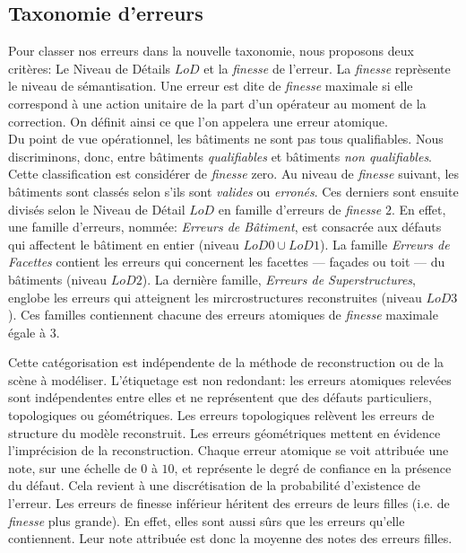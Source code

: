 \documentclass[a4paper,french]{article}
\begin{document}
    \subsection{Taxonomie d'erreurs}

    Pour classer nos erreurs dans la nouvelle taxonomie, nous proposons deux critères: Le Niveau de Détails $LoD$ et la \emph{finesse} de l'erreur. La \emph{finesse} reprèsente le niveau de sémantisation. Une erreur est dite de \emph{finesse} maximale si elle correspond à une action unitaire de la part d'un opérateur au moment de la correction. On définit ainsi ce que l'on appelera une erreur atomique.\\
    Du point de vue opérationnel, les bâtiments ne sont pas tous qualifiables. Nous discriminons, donc, entre bâtiments \emph{qualifiables} et bâtiments \emph{non qualifiables}. Cette classification est considérer de \emph{finesse} zero. Au niveau de \emph{finesse} suivant, les bâtiments sont classés selon s'ils sont \emph{valides} ou \emph{erronés}. Ces derniers sont ensuite divisés selon le Niveau de Détail $LoD$ en famille d'erreurs de \emph{finesse} $2$. En effet, une famille d'erreurs, nommée: \emph{Erreurs de Bâtiment}, est consacrée aux défauts qui affectent le bâtiment en entier (niveau $LoD 0\cup LoD 1$). La famille \emph{Erreurs de Facettes} contient les erreurs qui concernent les facettes --- façades ou toit --- du bâtiments (niveau $LoD 2$). La dernière famille, \emph{Erreurs de Superstructures}, englobe les erreurs qui atteignent les mircrostructures reconstruites (niveau $LoD 3$). Ces familles contiennent chacune des erreurs atomiques de \emph{finesse} maximale égale à $3$.

    Cette catégorisation est indépendente de la méthode de reconstruction ou de la scène à modéliser. L'étiquetage est non redondant: les erreurs atomiques relevées sont indépendentes entre elles et ne représentent que des défauts particuliers, topologiques ou géométriques. Les erreurs topologiques relèvent les erreurs de structure du modèle reconstruit. Les erreurs géométriques mettent en évidence l'imprécision de la reconstruction. Chaque erreur atomique se voit attribuée une note, sur une échelle de $0$ à $10$, et représente le degré de confiance en la présence du défaut. Cela revient à une discrétisation de la probabilité d'existence de l'erreur. Les erreurs de finesse inférieur héritent des erreurs de leurs filles (i.e. de \emph{finesse} plus grande). En effet, elles sont aussi sûrs que les erreurs qu'elle contiennent. Leur note attribuée est donc la moyenne des notes des erreurs filles.
\end{document}
